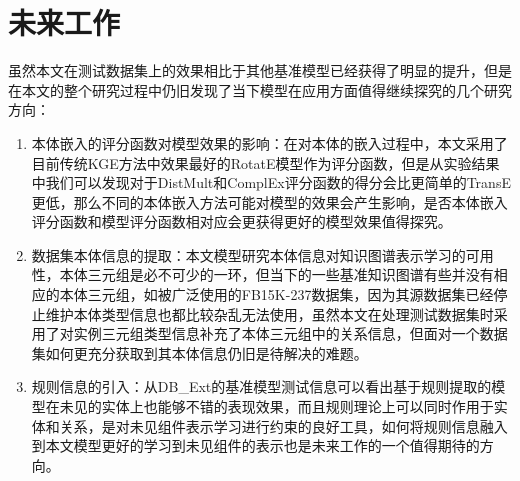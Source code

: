 \section{未来工作}
虽然本文在测试数据集上的效果相比于其他基准模型已经获得了明显的提升，但是在本文的整个研究过程中仍旧发现了当下模型在应用方面值得继续探究的几个研究方向：
\begin{enumerate}[label=\arabic*)]
  \item 本体嵌入的评分函数对模型效果的影响：在对本体的嵌入过程中，本文采用了目前传统KGE方法中效果最好的RotatE模型作为评分函数，但是从实验结果中我们可以发现对于DistMult和ComplEx评分函数的得分会比更简单的TransE更低，那么不同的本体嵌入方法可能对模型的效果会产生影响，是否本体嵌入评分函数和模型评分函数相对应会更获得更好的模型效果值得探究。
  \item 数据集本体信息的提取：本文模型研究本体信息对知识图谱表示学习的可用性，本体三元组是必不可少的一环，但当下的一些基准知识图谱有些并没有相应的本体三元组，如被广泛使用的FB15K-237数据集，因为其源数据集已经停止维护本体类型信息也都比较杂乱无法使用，虽然本文在处理测试数据集时采用了对实例三元组类型信息补充了本体三元组中的关系信息，但面对一个数据集如何更充分获取到其本体信息仍旧是待解决的难题。
  \item 规则信息的引入：从DB\_Ext的基准模型测试信息可以看出基于规则提取的模型在未见的实体上也能够不错的表现效果，而且规则理论上可以同时作用于实体和关系，是对未见组件表示学习进行约束的良好工具，如何将规则信息融入到本文模型更好的学习到未见组件的表示也是未来工作的一个值得期待的方向。
\end{enumerate}